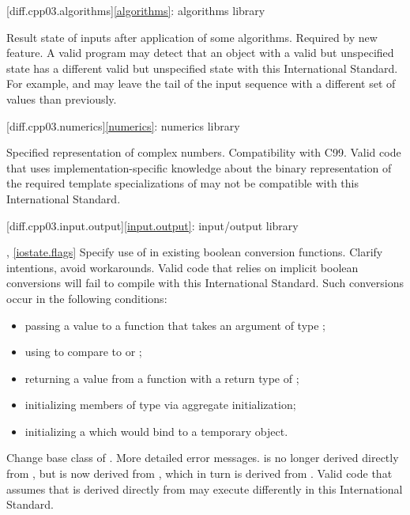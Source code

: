 [diff.cpp03.algorithms]{\ref{algorithms}: algorithms library}

\change Result state of inputs after application of some algorithms.
\rationale Required by new feature.
\effect
A valid \JavaIII{} program may detect that an object with a valid but
unspecified state has a different valid but unspecified state with this
International Standard. For example,  and
 may leave the tail of the input sequence with a
different set of values than previously.

[diff.cpp03.numerics]{\ref{numerics}: numerics library}

\change Specified representation of complex numbers.
\rationale Compatibility with C99.
\effect
Valid \JavaIII{} code that uses implementation-specific knowledge about the
binary representation of the required template specializations of
 may not be compatible with this International Standard.

[diff.cpp03.input.output]{\ref{input.output}: input/output library}

, \ref{iostate.flags}
\change Specify use of  in existing boolean conversion functions.
\rationale Clarify intentions, avoid workarounds.
\effect
Valid \JavaIII{} code that relies on implicit boolean conversions will fail to
compile with this International Standard. Such conversions occur in the
following conditions:

\begin{itemize}
\item passing a value to a function that takes an argument of type ;
\item using  to compare to  or ;
\item returning a value from a function with a return type of ;
\item initializing members of type  via aggregate initialization;
\item initializing a  which would bind to a temporary object.
\end{itemize}

\change Change base class of .
\rationale More detailed error messages.
\effect
{} is no longer derived directly from
, but is now derived from ,
which in turn is derived from . Valid \JavaIII{} code
that assumes that  is derived directly from
 may execute differently in this International Standard.

